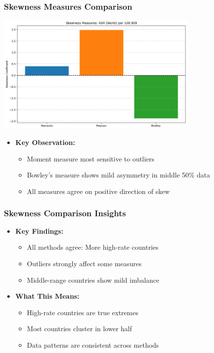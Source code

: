 \begin{frame}
    \frametitle{Skewness Measures Comparison}
    \centering
    \includegraphics[width=0.75\textwidth,height=0.6\textheight,keepaspectratio]{images/graph/skewness_comparison.png}
    \vspace{-0.5em}
    \begin{itemize}
        \item \textbf{Key Observation:}
        \begin{itemize}
            \item Moment measure most sensitive to outliers
            \item Bowley's measure shows mild asymmetry in middle 50\% data
            \item All measures agree on positive direction of skew
        \end{itemize}
    \end{itemize}
\end{frame}

\begin{frame}
    \frametitle{Skewness Comparison Insights}
    \begin{itemize}
        \item \textbf{Key Findings:}
        \begin{itemize}
            \item All methods agree: More high-rate countries
            \item Outliers strongly affect some measures
            \item Middle-range countries show mild imbalance
        \end{itemize}
        
        \item \textbf{What This Means:}
        \begin{itemize}
            \item High-rate countries are true extremes
            \item Most countries cluster in lower half
            \item Data patterns are consistent across methods
        \end{itemize}
    \end{itemize}
\end{frame}